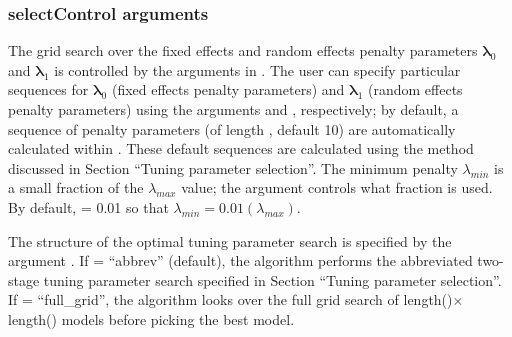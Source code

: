 \subsubsection{selectControl arguments}
\label{sec:selectControl}

The grid search over the fixed effects and random effects penalty parameters \(\boldsymbol \lambda_0\) and \(\boldsymbol \lambda_1\) is controlled by the arguments in . The user can specify particular sequences for $\boldsymbol \lambda_0$ (fixed effects penalty parameters) and $\boldsymbol \lambda_1$ (random effects penalty parameters) using the arguments  and , respectively; by default, a sequence of penalty parameters (of length , default 10) are automatically calculated within . These default sequences are calculated using the method discussed in Section ``Tuning parameter selection''.
The minimum penalty \(\lambda_{min}\) is a small fraction
of the \(\lambda_{max}\) value; the argument  controls
what fraction is used. By default,   = 0.01 so that
\(\lambda_{min} = 0.01(\lambda_{max})\).

The structure of the optimal tuning parameter search is specified by the argument
. If  = ``abbrev'' (default), the
algorithm performs the abbreviated two-stage tuning parameter search specified in
Section ``Tuning parameter selection''. If  = ``full\_grid'', the
algorithm looks over the full grid search of length()$\times$length() models
before picking the best model.

